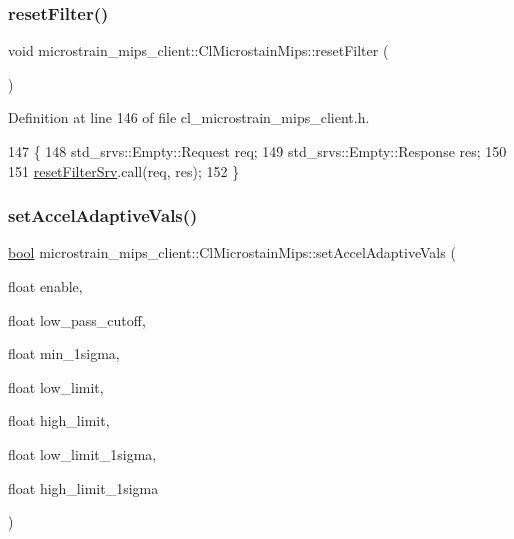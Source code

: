 \subsubsection{\texorpdfstring{reset\+Filter()}{resetFilter()}}
{\footnotesize\ttfamily void microstrain\+\_\+mips\+\_\+client\+::\+Cl\+Microstain\+Mips\+::reset\+Filter (\begin{DoxyParamCaption}{ }\end{DoxyParamCaption})\hspace{0.3cm}{\ttfamily [inline]}}



Definition at line 146 of file cl\+\_\+microstrain\+\_\+mips\+\_\+client.\+h.


\begin{DoxyCode}
147     \{
148         std\_srvs::Empty::Request req;
149         std\_srvs::Empty::Response res;
150 
151         \hyperlink{classmicrostrain__mips__client_1_1ClMicrostainMips_a160255b2be08602d22c371f49cdcfdc0}{resetFilterSrv}.call(req, res);
152     \}
\end{DoxyCode}
\mbox{\label{classmicrostrain__mips__client_1_1ClMicrostainMips_a93a968d06f2dfd58ce7ab568956df042}} 
\subsubsection{\texorpdfstring{set\+Accel\+Adaptive\+Vals()}{setAccelAdaptiveVals()}}
{\footnotesize\ttfamily \hyperlink{classbool}{bool} microstrain\+\_\+mips\+\_\+client\+::\+Cl\+Microstain\+Mips\+::set\+Accel\+Adaptive\+Vals (\begin{DoxyParamCaption}\item[{float}]{enable,  }\item[{float}]{low\+\_\+pass\+\_\+cutoff,  }\item[{float}]{min\+\_\+1sigma,  }\item[{float}]{low\+\_\+limit,  }\item[{float}]{high\+\_\+limit,  }\item[{float}]{low\+\_\+limit\+\_\+1sigma,  }\item[{float}]{high\+\_\+limit\+\_\+1sigma }\end{DoxyParamCaption})\hspace{0.3cm}{\ttfamily [inline]}}



